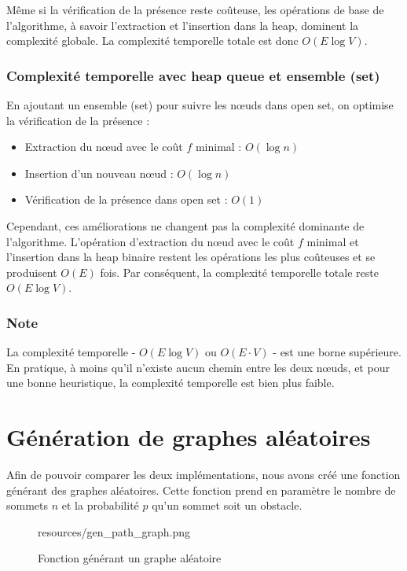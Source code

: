 Même si la vérification de la présence reste coûteuse, les opérations de base de l'algorithme, à savoir l'extraction et l'insertion dans la heap, dominent la complexité globale. La complexité temporelle totale est donc \( O(E \log V) \).

\subsubsection*{Complexité temporelle avec heap queue et ensemble (set)}
En ajoutant un ensemble (set) pour suivre les nœuds dans open set, on optimise la vérification de la présence :

\begin{itemize}
    \item Extraction du nœud avec le coût \( f \) minimal : \( O(\log n) \)
    \item Insertion d'un nouveau nœud : \( O(\log n) \)
    \item Vérification de la présence dans open set : \( O(1) \)
\end{itemize}

Cependant, ces améliorations ne changent pas la complexité dominante de l'algorithme. L'opération d'extraction du nœud avec le coût \( f \) minimal et l'insertion dans la heap binaire restent les opérations les plus coûteuses et se produisent \( O(E) \) fois. Par conséquent, la complexité temporelle totale reste \( O(E \log V) \).

\subsubsection*{Note}
La complexité temporelle - \( O(E \log V) \) ou \( O(E \cdot V) \) - est une borne supérieure. En pratique, à moins qu'il n'existe aucun chemin entre les deux nœuds, et pour une bonne heuristique, la complexité temporelle est bien plus faible.


\section{Génération de graphes aléatoires}
\label{sec:shortest_path_random_graph}

Afin de pouvoir comparer les deux implémentations, nous avons créé une fonction générant des graphes aléatoires. Cette fonction prend en paramètre le nombre de sommets $n$ et la probabilité $p$ qu'un sommet soit un obstacle.

\begin{figure}[H]
    \centering
    \begin{includegraphics}[width=1\textwidth]{resources/gen_path_graph.png}
    \end{includegraphics}
    \caption{Fonction générant un graphe aléatoire}
    \label{fig:gen_path_graph}
\end{figure}

